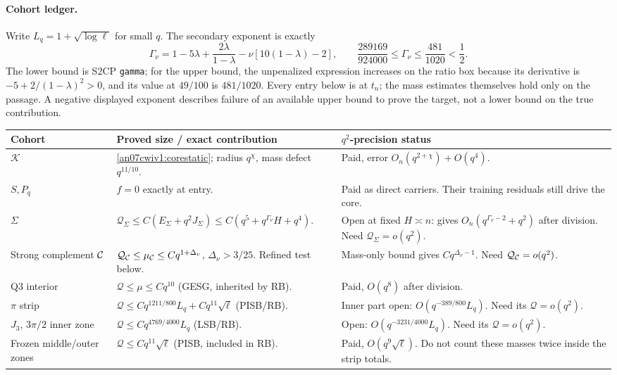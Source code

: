 \documentclass[11pt]{article}
\numberwithin{equation}{section}
\theoremstyle{remark}\newtheorem{remark}[theorem]{Remark}
\newcommand{\KK}{\mathcal K}\newcommand{\BB}{\mathcal B}
\begin{document}
\paragraph{Cohort ledger.}
Write \(L_q=1+\sqrt{\log\ell}\) for small \(q\). The secondary
exponent is exactly
\[
 \Gamma_\nu=1-5\lambda+\frac{2\lambda}{1-\lambda}
                   -\nu[10(1-\lambda)-2],\qquad
 \frac{289169}{924000}\le\Gamma_\nu
                    \le\frac{481}{1020}<\frac12 .
 \]
The lower bound is S2CP \texttt{gamma}; for the upper bound,
the unpenalized expression increases on the ratio box
because its derivative is \(-5+2/(1-\lambda)^2>0\), and its
value at \(49/100\) is \(481/1020\).
Every entry below is at \(t_n\); the mass estimates themselves
hold only on the passage. A negative displayed exponent describes
failure of an available upper bound to prove the target,
not a lower bound on the true contribution.
\small
\begin{longtable}{>{\raggedright\arraybackslash}p{}>{\raggedright\arraybackslash}p{}>{\raggedright\arraybackslash}p{}}
\toprule Cohort & Proved size / exact contribution & \(q^2\)-precision status\\\midrule
\endhead
\(\KK\) & \eqref{an07cwiv1:corestatic}; radius \(q^\chi\),
 mass defect \(q^{11/10}\). & Paid, error \(O_n(q^{2+\chi})+O(q^4)\).\\
\(S,P_q\) & \(f=0\) exactly at entry. & Paid as direct carriers.
 Their training residuals still drive the core.\\
\(\Sigma\) & \(\mathcal Q_\Sigma\le
 C(E_\Sigma+q^2J_\Sigma)\le
 C(q^5+q^{\Gamma_\nu}H+q^4)\).
 & Open at fixed \(H\asymp n\): gives
 \(O_n(q^{\Gamma_\nu-2}+q^2)\) after division.
 Need \(\mathcal Q_\Sigma=o(q^2)\).\\
Strong complement \(\mathcal C\) & \(\mathcal Q_\mathcal C\le\mu_\mathcal C
 \le Cq^{1+\Delta_\nu}\), \(\Delta_\nu>3/25\).
 Refined test below. & Mass-only bound gives \(Cq^{\Delta_\nu-1}\).
 Need \(\mathcal Q_\mathcal C=o(q^2)\).\\
Q3 interior & \(\mathcal Q\le\mu\le Cq^{10}\)
 (GESG, inherited by RB). & Paid, \(O(q^8)\) after division.\\
\(\pi\) strip & \(\mathcal Q\le Cq^{1211/800}L_q+
 Cq^{11}\sqrt\ell\) (PISB/RB).
 & Inner part open: \(O(q^{-389/800}L_q)\).
 Need its \(\mathcal Q=o(q^2)\).\\
\(J_3\), \(3\pi/2\) inner zone & \(\mathcal Q\le
 Cq^{4769/4000}L_q\) (LSB/RB).
 & Open: \(O(q^{-3231/4000}L_q)\).
 Need its \(\mathcal Q=o(q^2)\).\\
Frozen middle/outer zones & \(\mathcal Q\le
 Cq^{11}\sqrt\ell\) (PISB, included in RB).
 & Paid, \(O(q^9\sqrt\ell)\). Do not count these masses twice
 inside the strip totals.\\\bottomrule
\end{longtable}\normalsize
\end{document}
